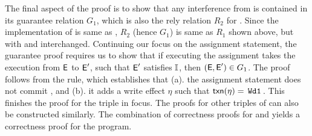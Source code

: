 The final aspect of the proof is to show that any interference from
 is contained in its guarantee relation $G_1$, which is also
the rely relation $R_2$ for . Since the implementation of
 is same as , $R_2$ (hence $G_1$) is same as $R_1$ shown
above, but with  and  interchanged. Continuing our focus
on the assignment statement, the guarantee proof requires us to show
that if executing the assignment takes the execution from $\textsf{E}$ to
$\textsf{E}'$, such that $\textsf{E}'$ satisfies $\mathbb{I}$, then $(\textsf{E},\textsf{E}') \in G_1$.  The
proof follows from the  rule, which establishes
that (a). the assignment statement does not commit , and (b).
it adds a write effect $\eta$ such that $\textsf{txn}(\eta)=\,{\tt Wd1}\,$. This
finishes the proof for the triple in focus. The proofs for other
triples of  can also be constructed similarly. The combination
of correctness proofs for  and  yields a correctness
proof for the program.


